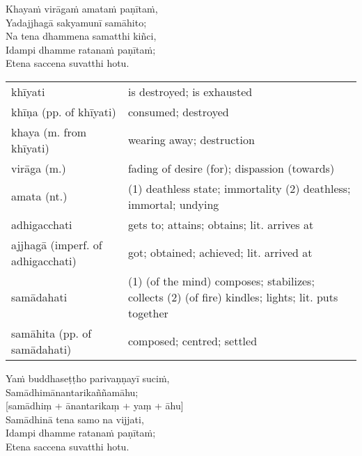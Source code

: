 \documentclass[11pt,oneside]{memoir}
\begin{document}
\begin{spacedquote}
Khayaṁ virāgaṁ amataṁ paṇītaṁ, \\[0pt]
Yadajjhagā sakyamunī samāhito; \\[0pt]
Na tena dhammena samatthi kiñci, \\[0pt]
Idampi dhamme ratanaṁ paṇītaṁ; \\[0pt]
Etena saccena suvatthi hotu.
\end{spacedquote}

\enlargethispage{\baselineskip}

\begin{longtable}{L{\colOne} L{\colTwo}}
khīyati & is destroyed; is exhausted\\[0pt]
khīṇa (pp. of khīyati) & consumed; destroyed\\[0pt]
khaya (m. from khīyati) & wearing away; destruction\\[0pt]
virāga (m.) & fading of desire (for); dispassion (towards)\\[0pt]
amata (nt.) & (1) deathless state; immortality (2) deathless; immortal; undying\\[0pt]
adhigacchati & gets to; attains; obtains; lit. arrives at\\[0pt]
ajjhagā (imperf. of adhigacchati) & got; obtained; achieved; lit. arrived at\\[0pt]
samādahati & (1) (of the mind) composes; stabilizes; collects (2) (of fire) kindles; lights; lit. puts together\\[0pt]
samāhita (pp. of samādahati) & composed; centred; settled\\[0pt]
\end{longtable}

\clearpage

\begin{spacedquote}
Yaṁ buddhaseṭṭho parivaṇṇayī suciṁ, \\[0pt]
Samādhimānantarikaññamāhu; \\[0pt]
[samādhiṃ + ānantarikaṃ + yaṃ + āhu] \\[0pt]
Samādhinā tena samo na vijjati, \\[0pt]
Idampi dhamme ratanaṁ paṇītaṁ; \\[0pt]
Etena saccena suvatthi hotu.
\end{spacedquote}
\end{document}
